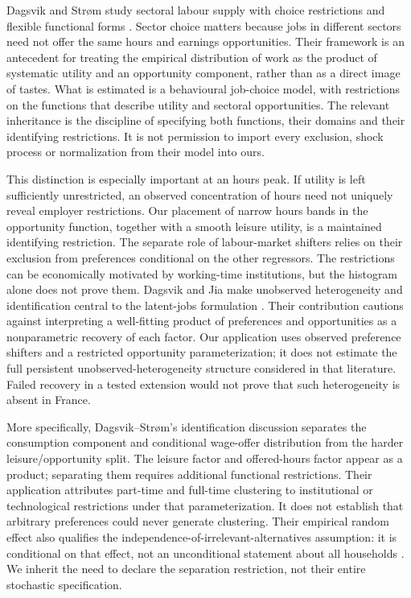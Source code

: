 \documentclass[11pt,a4paper]{article}
\begin{document}
Dagsvik and Strøm study sectoral labour supply with choice restrictions and flexible functional forms \citep[model exposition]{dagsvikstrom2006}. Sector choice matters because jobs in different sectors need not offer the same hours and earnings opportunities. Their framework is an antecedent for treating the empirical distribution of work as the product of systematic utility and an opportunity component, rather than as a direct image of tastes. What is estimated is a behavioural job-choice model, with restrictions on the functions that describe utility and sectoral opportunities. The relevant inheritance is the discipline of specifying both functions, their domains and their identifying restrictions. It is not permission to import every exclusion, shock process or normalization from their model into ours.

This distinction is especially important at an hours peak. If utility is left sufficiently unrestricted, an observed concentration of hours need not uniquely reveal employer restrictions. Our placement of narrow hours bands in the opportunity function, together with a smooth leisure utility, is a maintained identifying restriction. The separate role of labour-market shifters relies on their exclusion from preferences conditional on the other regressors. The restrictions can be economically motivated by working-time institutions, but the histogram alone does not prove them. Dagsvik and Jia make unobserved heterogeneity and identification central to the latent-jobs formulation \citep{dagsvikjia2016}. Their contribution cautions against interpreting a well-fitting product of preferences and opportunities as a nonparametric recovery of each factor. Our application uses observed preference shifters and a restricted opportunity parameterization; it does not estimate the full persistent unobserved-heterogeneity structure considered in that literature. Failed recovery in a tested extension would not prove that such heterogeneity is absent in France.

More specifically, Dagsvik--Strøm's identification discussion separates the consumption component and conditional wage-offer distribution from the harder leisure/opportunity split. The leisure factor and offered-hours factor appear as a product; separating them requires additional functional restrictions. Their application attributes part-time and full-time clustering to institutional or technological restrictions under that parameterization. It does not establish that arbitrary preferences could never generate clustering. Their empirical random effect also qualifies the independence-of-irrelevant-alternatives assumption: it is conditional on that effect, not an unconditional statement about all households \citep[identification discussion and empirical specification]{dagsvikstrom2006}. We inherit the need to declare the separation restriction, not their entire stochastic specification.
\end{document}
